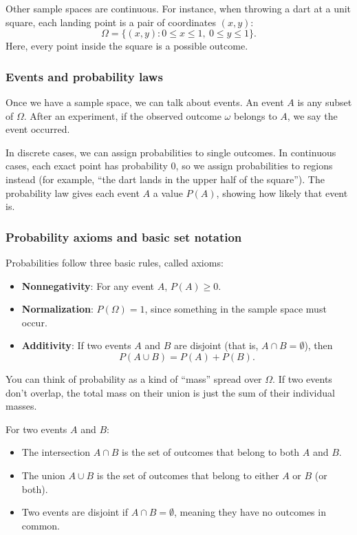 Other sample spaces are continuous. For instance, when throwing a dart at a unit square, each landing point is a pair of coordinates \((x,y)\):
\[
\Omega = \{(x,y): 0 \le x \le 1,\ 0 \le y \le 1\}.
\]
Here, every point inside the square is a possible outcome.

\subsubsection{Events and probability laws}

Once we have a sample space, we can talk about events. An event \(A\) is any subset of \(\Omega\). After an experiment, if the observed outcome \(\omega\) belongs to \(A\), we say the event occurred.

In discrete cases, we can assign probabilities to single outcomes. In continuous cases, each exact point has probability 0, so we assign probabilities to regions instead (for example, “the dart lands in the upper half of the square”). The probability law gives each event \(A\) a value \(P(A)\), showing how likely that event is.

\subsubsection{Probability axioms and basic set notation}

Probabilities follow three basic rules, called axioms:

\begin{itemize}
    \item \textbf{Nonnegativity}: For any event \(A\), \(P(A) \ge 0\).
    \item \textbf{Normalization}: \(P(\Omega) = 1\), since something in the sample space must occur.
    \item \textbf{Additivity}: If two events \(A\) and \(B\) are disjoint (that is, \(A \cap B = \emptyset\)), then
    \[
    P(A \cup B) = P(A) + P(B).
    \]
\end{itemize}

You can think of probability as a kind of “mass” spread over \(\Omega\). If two events don’t overlap, the total mass on their union is just the sum of their individual masses.

\newpage
For two events \(A\) and \(B\):
\begin{itemize}
    \item The intersection \(A \cap B\) is the set of outcomes that belong to both \(A\) and \(B\).
    \item The union \(A \cup B\) is the set of outcomes that belong to either \(A\) or \(B\) (or both).
    \item Two events are disjoint if \(A \cap B = \emptyset\), meaning they have no outcomes in common.
\end{itemize}


